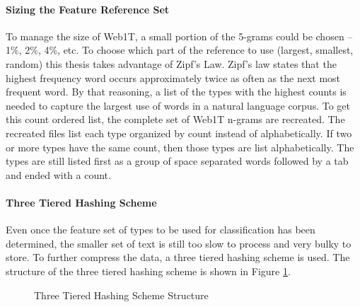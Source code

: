 		\paragraph{Sizing the Feature Reference Set} To manage the size of Web1T, a small portion of the 5-grams could be chosen -- 1\%, 2\%, 4\%, etc.  To choose which part of the reference to use (largest, smallest, random) this thesis takes advantage of Zipf's Law.  Zipf's law states that the highest frequency word occurs approximately twice as often as the next most frequent word.  By that reasoning, a list of the types with the highest counts is needed to capture the largest use of words in a natural language corpus.  To get this count ordered list, the complete set of Web1T n-grams are recreated.  The recreated files list each type organized by count instead of alphabetically.  If two or more types have the same count, then those types are list alphabetically.  The types are still listed first as a group of space separated words followed by a tab and ended with a count.

		\paragraph{Three Tiered Hashing Scheme} Even once the feature set of types to be used for classification has been determined, the smaller set of text is still too slow to process and very bulky to store.  To further compress the data, a three tiered hashing scheme is used.  The structure of the three tiered hashing scheme is shown in Figure \ref{fig:3tierHashStructure}. 
		
		\begin{figure}[h!]
			\begin{center}
				\caption{Three Tiered Hashing Scheme Structure}
				\label{fig:3tierHashStructure}
			\end{center}
		\end{figure}
		
